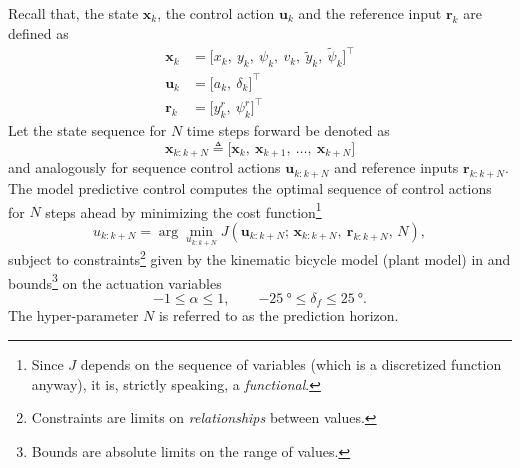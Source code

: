 \documentclass[a4paper]{article}
\begin{document}
Recall that, the state \( \bm{x}_k \), the control action \( \bm{u}_k \) and the reference input \( \bm{r}_k \) are defined as
\begin{align}
	\bm{x}_k &= \big[x_k,\ y_k,\ \psi_k,\ v_k,\ \tilde{y}_k,\ \tilde{\psi}_k \big]^\top \\
	\bm{u}_k &= \big[a_k,\ \delta_k\big]^\top \\
	\bm{r}_k &= \big[y^r_k,\ \psi^r_k \big]^\top
\end{align}
Let the state sequence for \( N \) time steps forward be denoted as 
\begin{equation}
	\bm{x}_{k:k+N} \triangleq \big[ \bm{x}_k,\ \bm{x}_{k+1},\ \ldots,\ \bm{x}_{k+N} \big]
\end{equation}
and analogously for sequence control actions \(  \bm{u}_{k:k+N} \) and reference inputs \( \bm{r}_{k:k+N} \).
The model predictive control computes the optimal sequence of control actions for \( N \) steps ahead by minimizing the cost function\footnote{Since \( J \) depends on the sequence of variables (which is a discretized function anyway), it is, strictly speaking, a \emph{functional}.}
\begin{equation}
u_{k:k+N} = \arg\min_{u_{k:k+N}} J(\bm{u}_{k:k+N};\, \bm{x}_{k:k+N},\ \bm{r}_{k:k+N},\, N),
\end{equation}
subject to constraints\footnote{Constraints are limits on \emph{relationships} between values.} given by the kinematic bicycle model (plant model) in  and bounds\footnote{Bounds are absolute limits on the range of values.} on the actuation variables
\begin{equation}\label{eq:mpc_actuation_bounds}
-1 \leq \alpha \leq 1 ,\qquad \SI{-25}{\degree} \leq \delta_f \leq \SI{25}{\degree}.
\end{equation}
The hyper-parameter \( N \) is referred to as the prediction horizon.
\end{document}
